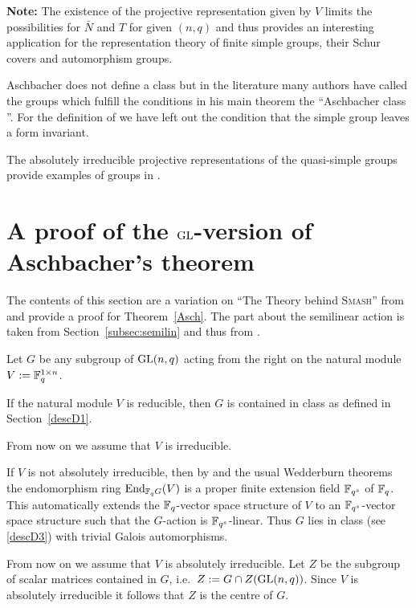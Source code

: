 \textbf{Note:} The existence of the projective representation given by $V$
limits the possibilities for $\bar N$ and $T$ for given $(n,q)$ and thus
provides an interesting application for the representation theory of finite
simple groups, their Schur covers and automorphism groups.

\medskip
{}
Aschbacher does not define a class  but in the literature many
authors have called the groups which fulfill the conditions in
his main theorem the ``Aschbacher class ''.
For the definition of  we have left out the condition that the
simple group leaves a form invariant.

\smallskip
\exmemb
The absolutely irreducible projective representations of the
quasi-simple groups provide examples of groups in .


\section{A proof of the $\mathbf{\GL}$-version of Aschbacher's theorem}
\label{AschProof}

The contents of this section are a variation on ``The Theory behind
\textsc{Smash}'' from \cite[Section~2]{smashnormal} and provide a proof for
%
Theorem~\ref{Asch}. The part about the semilinear action is taken
from Section~\ref{subsec:semilin} and thus from 
\cite[Section~6.4]{subfieldpaper}.

Let $G$ be any subgroup of $\GL(n,q)$ acting from the right on the
natural module $V := \mathbb{F}_q^{1 \times n}$.

If the natural module $V$ is reducible, then $G$ is contained in class 
as defined in Section~\ref{descD1}.

From now on we assume that $V$ is irreducible.

If $V$ is not absolutely irreducible, then by \cite[(29.13)]{CR0} and the 
usual Wedderburn theorems
the endomorphism ring $\End_{\F_q G}(V)$ is a proper finite extension field
$\mathbb{F}_{q^s}$ of $\mathbb{F}_q$. This automatically extends the $\mathbb{F}_q$-vector
space structure of $V$ to an $\mathbb{F}_{q^s}$-vector space structure
such that the $G$-action is $\mathbb{F}_{q^s}$-linear. Thus $G$ lies in class
 (see \ref{descD3}) with trivial Galois automorphisms.

From now on we assume that $V$ is absolutely irreducible. Let $Z$ be the
subgroup of scalar matrices contained in $G$, i.e.~$Z := G \cap
Z(\GL(n,q))$. Since $V$ is absolutely irreducible it follows that $Z$ is
the centre of $G$.

